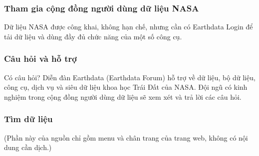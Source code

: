 \subsubsection{Tham gia cộng đồng người dùng dữ liệu NASA}

Dữ liệu NASA được công khai, không hạn chế, nhưng cần có Earthdata Login để tải dữ liệu và dùng đầy đủ chức năng của một số công cụ.

\subsubsection{Câu hỏi và hỗ trợ}

Có câu hỏi? Diễn đàn Earthdata (Earthdata Forum) hỗ trợ về dữ liệu, bộ dữ liệu, công cụ, dịch vụ và siêu dữ liệu khoa học Trái Đất của NASA. Đội ngũ có kinh nghiệm trong cộng đồng người dùng dữ liệu sẽ xem xét và trả lời các câu hỏi.

\subsubsection{Tìm dữ liệu}

(Phần này của nguồn chỉ gồm menu và chân trang của trang web, không có nội dung cần dịch.)
